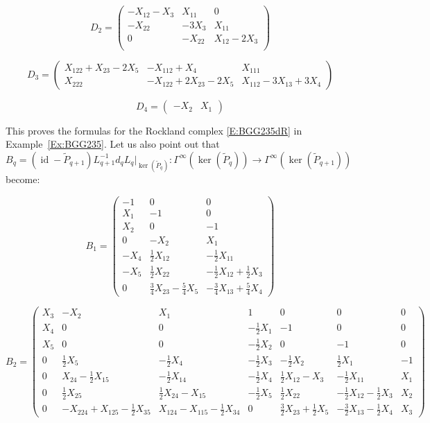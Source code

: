 \documentclass[reqno,12pt]{amsart}
\DeclareMathOperator{\id}{id}
\theoremstyle{plain}
\theoremstyle{definition}
\begin{document}
$$
D_2=\left(\begin{array}{ccc}
-X_{12}-X_3&X_{11}& 0\\         
-X_{22}&-3X_3&  X_{11}\\ 
0&        -X_{22}&X_{12}-2X_3\\
\end{array}\right)
$$

$$
D_3=\left(\begin{array}{ccc}
X_{122}+X_{23}-2X_5&-X_{112}+X_4&X_{111}\\
X_{222}&-X_{122}+2X_{23}-2X_5&X_{112}-3X_{13}+3X_4
\end{array}\right)
$$

$$
D_4=\left(\begin{array}{cc}
-X_2&X_1
\end{array}\right)
$$

This proves the formulas for the Rockland complex \eqref{E:BGG235dR} in Example~\ref{Ex:BGG235}.
Let us also point out that $B_q=(\id-\tilde P_{q+1})L_{q+1}^{-1}d_qL_q|_{\ker(\tilde P_q)}\colon\Gamma^\infty(\ker(\tilde P_q))\to\Gamma^\infty(\ker(\tilde P_{q+1}))$ become:

$$
B_1=\left(\begin{array}{c|cc}
-1& 0&               0\\\hline
X_1& -1&              0\\
X_2& 0&               -1\\\hline
0&  -X_2&         X_1\\\hline
-X_4&\tfrac12X_{12}&       -\tfrac12X_{11}\\
-X_5&\tfrac12X_{22}&        -\tfrac12X_{12}+\tfrac12X_3\\\hline
0&  \tfrac34X_{23}-\tfrac54X_5&-\tfrac34X_{13}+\tfrac54X_4
\end{array}\right)
$$

$$
B_2=\left(\begin{array}{c|cc|c|cc|c}
X_3&-X_2&    X_1&     1&           0&      0&      0\\\hline
X_4&0&      0&      -\tfrac12X_1& -1&     0&      0\\
X_5&0&      0&      -\tfrac12X_2& 0&      -1&     0\\\hline
0& \tfrac12X_5& -\tfrac12X_4&-\tfrac12X_3& -\tfrac12X_2&\tfrac12X_1& -1\\\hline
0&X_{24}-\tfrac12X_{15}&-\tfrac12X_{14}&-\tfrac12X_4&\tfrac12X_{12}-X_3&-\tfrac12X_{11}&X_1\\
0&\tfrac12X_{25}&\tfrac12X_{24}-X_{15}&-\tfrac12X_5&\tfrac12X_{22}&-\tfrac12X_{12}-\tfrac12X_3&X_2\\\hline
0&-X_{224}+X_{125}-\tfrac12X_{35}&X_{124}-X_{115}-\tfrac12X_{34}&0&\tfrac32X_{23}+\tfrac12X_5&-\tfrac32X_{13}-\tfrac12X_4&X_3
\end{array}\right)
$$
\end{document}
